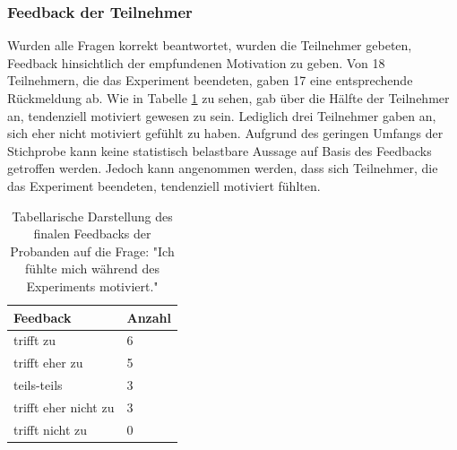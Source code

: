 \subsubsection{Feedback der Teilnehmer}
Wurden alle Fragen korrekt beantwortet, wurden die Teilnehmer gebeten, Feedback hinsichtlich der empfundenen Motivation zu geben. Von 18 Teilnehmern, die das Experiment beendeten, gaben 17 eine entsprechende Rückmeldung ab. Wie in Tabelle \ref{feedback} zu sehen, gab über die Hälfte der Teilnehmer an, tendenziell motiviert gewesen zu sein. Lediglich drei Teilnehmer gaben an, sich eher nicht motiviert gefühlt zu haben. Aufgrund des geringen Umfangs der Stichprobe kann keine statistisch belastbare Aussage auf Basis des Feedbacks getroffen werden. Jedoch kann angenommen werden, dass sich Teilnehmer, die das Experiment beendeten, tendenziell motiviert fühlten.

\begin{table}[htbp]
\centering
\begin{tabular}{ p{4cm} |  p{2cm}}
 Feedback & Anzahl \\
 \hline
 trifft zu & 6 \\
 trifft eher zu & 5 \\
 teils-teils & 3 \\
 trifft eher nicht zu & 3 \\
 trifft nicht zu & 0 \\
 \hline
\end{tabular}
\caption{Tabellarische Darstellung des finalen Feedbacks der Probanden auf die Frage: "Ich fühlte mich während des Experiments motiviert."}
\label{feedback}
\end{table}